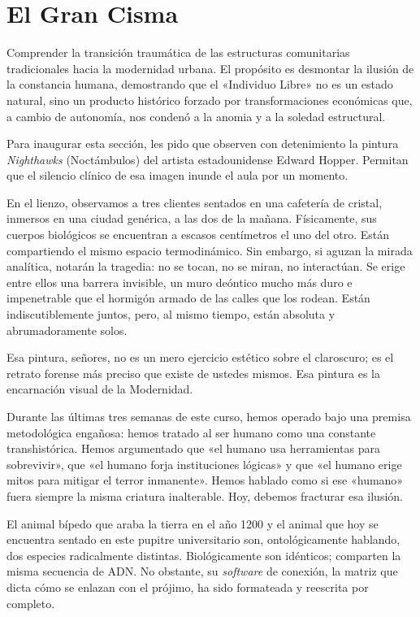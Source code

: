 \chapter{El Gran Cisma}
\label{cap:gran_cisma}

\begin{objetivo}
Comprender la transición traumática de las estructuras comunitarias tradicionales hacia la modernidad urbana. El propósito es desmontar la ilusión de la constancia humana, demostrando que el «Individuo Libre» no es un estado natural, sino un producto histórico forzado por transformaciones económicas que, a cambio de autonomía, nos condenó a la anomia y a la soledad estructural.
\end{objetivo}

Para inaugurar esta sección, les pido que observen con detenimiento la pintura \textit{Nighthawks} (Noctámbulos) del artista estadounidense Edward Hopper. Permitan que el silencio clínico de esa imagen inunde el aula por un momento. 

En el lienzo, observamos a tres clientes sentados en una cafetería de cristal, inmersos en una ciudad genérica, a las dos de la mañana. Físicamente, sus cuerpos biológicos se encuentran a escasos centímetros el uno del otro. Están compartiendo el mismo espacio termodinámico. Sin embargo, si aguzan la mirada analítica, notarán la tragedia: no se tocan, no se miran, no interactúan. Se erige entre ellos una barrera invisible, un muro deóntico mucho más duro e impenetrable que el hormigón armado de las calles que los rodean. Están indiscutiblemente juntos, pero, al mismo tiempo, están absoluta y abrumadoramente solos. 

Esa pintura, señores, no es un mero ejercicio estético sobre el claroscuro; es el retrato forense más preciso que existe de ustedes mismos. Esa pintura es la encarnación visual de la Modernidad.

Durante las últimas tres semanas de este curso, hemos operado bajo una premisa metodológica engañosa: hemos tratado al ser humano como una constante transhistórica. Hemos argumentado que «el humano usa herramientas para sobrevivir», que «el humano forja instituciones lógicas» y que «el humano erige mitos para mitigar el terror inmanente». Hemos hablado como si ese «humano» fuera siempre la misma criatura inalterable. Hoy, debemos fracturar esa ilusión. 

El animal bípedo que araba la tierra en el año 1200 y el animal que hoy se encuentra sentado en este pupitre universitario son, ontológicamente hablando, dos especies radicalmente distintas. Biológicamente son idénticos; comparten la misma secuencia de ADN. No obstante, su \textit{software} de conexión, la matriz que dicta cómo se enlazan con el prójimo, ha sido formateada y reescrita por completo. 

